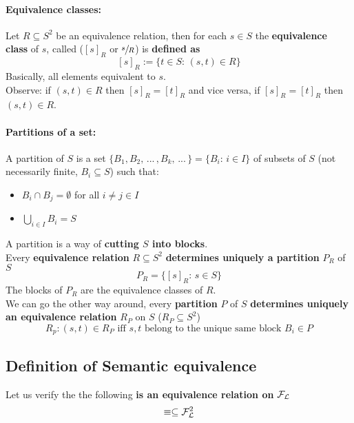 	\paragraph{Equivalence classes:} Let $R \subseteq S^2$ be an equivalence relation, then for each $s \in S$ the \textbf{equivalence class} of $s$, called ($[s]_R$ or $\sfrac{s}{R}$) is \textbf{defined as}
	$$ [s]_R := \{t \in S: \, (s,t) \in R\} $$
	Basically, all elements equivalent to $s$.\\

	Observe: if $(s,t) \in R$ then $[s]_R = [t]_R$ and vice versa, if $[s]_R = [t]_R$ then $(s,t) \in R$.

	\newpage

	\paragraph{Partitions of a set:} A partition of $S$ is a set $\{B_1, B_2, \, ... \, , B_k , \, ... \, \} = \{B_i : \, i \in  I\}$ of subsets of $S$ (not necessarily finite, $B_i \subseteq S$) such that:
	\begin{itemize}
		\item $B_i \cap B_j = \emptyset$ for all $i \neq j \in I$
		\item $\bigcup_{i \in I} B_i = S$
	\end{itemize}

	A partition is a way of \textbf{cutting $S$ into blocks}.\\
%
%

	Every \textbf{equivalence relation} $R \subseteq S^2$ \textbf{determines uniquely a partition} $P_R$ of $S$
	$$ P_R = \{[s]_R : \, s \in S \}$$
	The blocks of $P_R$ are the equivalence classes of $R$.\\

	We can go the other way around, every \textbf{partition} $P$ of $S$ \textbf{determines uniquely an equivalence relation} $R_P$ on $S$ ($R_P \subseteq S^2$)
	$$ R_p : (s,t) \in R_P \text{ iff } s,t \text{ belong to the unique same block } B_i \in P$$

	\nn

	\subsection{Definition of Semantic equivalence}
	Let us verify the the following \textbf{is an equivalence relation on} $\mathcal{F}_\mathcal{L}$
	$$ \equiv \subseteq \mathcal{F}_\mathcal{L}^2$$

